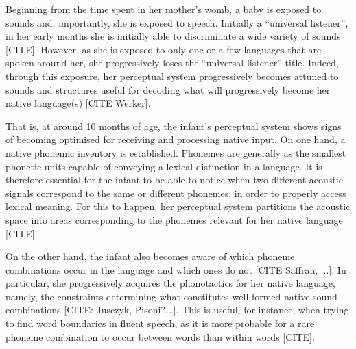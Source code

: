 




Beginning from the time spent in her mother's womb, a baby is exposed to sounds and, importantly, she is exposed to speech. Initially a ``universal listener'', in her early months she is initially able to discriminate a wide variety of sounds [CITE]. However, as she is exposed to only one or a few languages that are spoken around her, she progressively loses the ``universal listener'' title. Indeed, through this exposure, her perceptual system progressively becomes attuned to sounds and structures useful for decoding what will progressively become her native language(s) [CITE Werker].

That is, at around 10 months of age, the infant's perceptual system shows signs of becoming optimised for receiving and processing native input.
On one hand, a native phonemic inventory is established. Phonemes are generally as the smallest phonetic units capable of conveying a lexical distinction in a language. It is therefore essential for the infant to be able to notice when two different acoustic signals correspond to the same or different phonemes, in order to properly access lexical meaning. For this to happen, her perceptual system partitions the acoustic space into areas corresponding to the phonemes relevant for her native language [CITE]. 

On the other hand, the infant also becomes aware of which phoneme combinations occur in the language and which ones do not [CITE Saffran, ...]. In particular, she progressively acquires the phonotactics for her native language, namely, the constraints determining what constitutes well-formed native sound combinations [CITE: Jusczyk, Pisoni?...]. This is useful, for instance, when trying to find word boundaries in fluent speech, as it is more probable for a rare phoneme combination to occur between words than within words [CITE]. 

